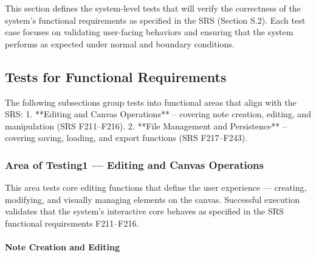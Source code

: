 \documentclass[12pt, titlepage]{article}
\begin{document}

This section defines the system-level tests that will verify the correctness of the system’s
functional requirements as specified in the SRS (Section S.2). Each test case focuses on validating
user-facing behaviors and ensuring that the system performs as expected under normal and boundary conditions.

\subsection{Tests for Functional Requirements}



The following subsections group tests into functional areas that align with the SRS:
1. **Editing and Canvas Operations** – covering note creation, editing, and manipulation (SRS F211–F216).
2. **File Management and Persistence** – covering saving, loading, and export functions (SRS F217–F243).

\subsubsection{Area of Testing1 — Editing and Canvas Operations}


This area tests core editing functions that define the user experience — creating, modifying, and visually
managing elements on the canvas. Successful execution validates that the system’s interactive core behaves
as specified in the SRS functional requirements F211–F216.

\paragraph{Note Creation and Editing}
\end{document}
